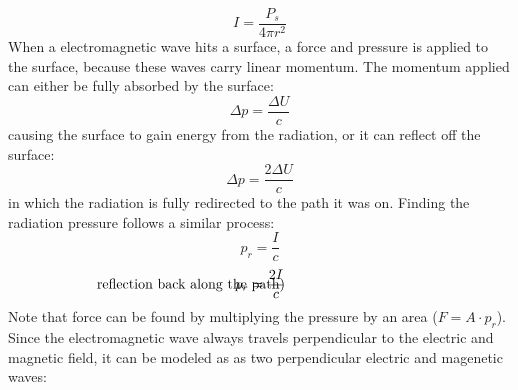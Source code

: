 \documentclass[11pt]{article}
\begin{document}
    \begin{equation}
      I = \frac{P_s}{4 \pi r^2} \tag{intensity}
    \end{equation}
    When a electromagnetic wave hits a surface, a force and pressure is applied to the surface,
    because these waves carry linear momentum.
    The momentum applied can either be fully absorbed by the surface:
    \begin{equation}
      \Delta p = \frac{\Delta U}{c} \tag{total absorption}
    \end{equation}
    causing the surface to gain energy from the radiation,
    or it can reflect off the surface:
    \begin{equation}
      \Delta p = \frac{2 \Delta U}{c} \tag{total reflection}
    \end{equation}
    in which the radiation is fully redirected to the path it was on.
    Finding the radiation pressure follows a similar process:
    \begin{equation}
      p_r = \frac{I}{c} \tag{total absorption}
    \end{equation}
    \begin{equation}
      p_r = \frac{2I}{c} \hspace{-6.4cm} \tag{total reflection back along the path} 
    \end{equation}
    Note that force can be found by multiplying the pressure by an area ($F = A \cdot p_r$).
    \newpage
    \noindent Since the electromagnetic wave always travels perpendicular to the electric and magnetic field,
    it can be modeled as as two perpendicular \textcolor{myblue}{electric} and \textcolor{myred}{magenetic} waves:
\end{document}
